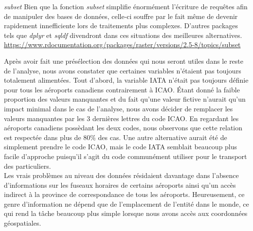 \begin{moreInfo}{\emph{subset}}
	Bien que la fonction \emph{subset} simplifie énormément l'écriture de requêtes afin de manipuler des bases de données, celle-ci souffre par le fait même de devenir rapidement innefficiente lors de traitements plus complexes. D'autres packages tels que \emph{dplyr} et \emph{sqldf} divendront dans ces situations des meilleures alternatives. \\
	\url{https://www.rdocumentation.org/packages/raster/versions/2.5-8/topics/subset}
\end{moreInfo}

\noindent
Après avoir fait une présélection des données qui nous seront utiles dans le reste de l'analyse, nous avons constater que certaines variables n'étaient pas toujours totalement alimentées. Tout d'abord, la variable IATA n'était pas toujours définie pour tous les aéroports canadiens contrairement à ICAO. Étant donné la faible proportion des valeurs manquantes et du fait qu'une valeur fictive n'aurait qu'un impact minimal dans le cas de l'analyse, nous avons décider de remplacer les valeurs manquantes par les 3 dernières lettres du code ICAO. En regardant les aéroports canadiens possèdant les deux codes, nous observons que cette relation est respectée dans plus de 80\% des cas. Une autre alternative aurait été de simplement prendre le code ICAO, mais le code IATA semblait beaucoup plus facile d'approche puisqu'il s'agit du code communément utiliser pour le transport des particuliers. \\

\noindent
Les vrais problèmes au niveau des données résidaient davantage dans l'absence d'informations sur les fuseaux horaires de certains aéroports ainsi qu'un accès indirect à la province de correspondance de tous les aéroports. Heureusement, ce genre d'information ne dépend que de l'emplacement de l'entité dans le monde, ce qui rend la tâche beaucoup plus simple lorsque nous avons accès aux coordonnées géospatiales. \\

